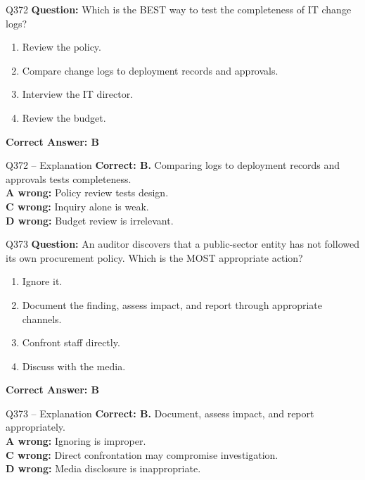 \documentclass[aspectratio=169,10pt]{beamer}
\begin{document}
	\begin{frame}[t]{Q372}
		\small
		\textbf{Question:} Which is the BEST way to test the completeness of IT change logs?
		\begin{enumerate}[label=\Alph*.,itemsep=1pt,topsep=2pt]
			\item Review the policy.
			\item Compare change logs to deployment records and approvals.
			\item Interview the IT director.
			\item Review the budget.
		\end{enumerate}
		\vspace{4pt}
		\textbf{Correct Answer: B}
	\end{frame}
	
	\begin{frame}[t]{Q372 -- Explanation}
		\small
		\textbf{Correct: B.} Comparing logs to deployment records and approvals tests completeness. \\[4pt]
		\textbf{A wrong:} Policy review tests design. \\[2pt]
		\textbf{C wrong:} Inquiry alone is weak. \\[2pt]
		\textbf{D wrong:} Budget review is irrelevant.
	\end{frame}
	
	\begin{frame}[t]{Q373}
		\small
		\textbf{Question:} An auditor discovers that a public-sector entity has not followed its own procurement policy. Which is the MOST appropriate action?
		\begin{enumerate}[label=\Alph*.,itemsep=1pt,topsep=2pt]
			\item Ignore it.
			\item Document the finding, assess impact, and report through appropriate channels.
			\item Confront staff directly.
			\item Discuss with the media.
		\end{enumerate}
		\vspace{4pt}
		\textbf{Correct Answer: B}
	\end{frame}
	
	\begin{frame}[t]{Q373 -- Explanation}
		\small
		\textbf{Correct: B.} Document, assess impact, and report appropriately. \\[4pt]
		\textbf{A wrong:} Ignoring is improper. \\[2pt]
		\textbf{C wrong:} Direct confrontation may compromise investigation. \\[2pt]
		\textbf{D wrong:} Media disclosure is inappropriate.
	\end{frame}
	
\end{document}
